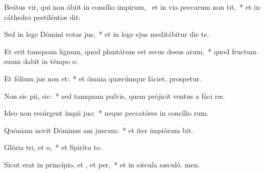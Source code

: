 \item Beátus vir, qui non ábiit in consílio impirum,~\pscross{} et in via peccarum non tit,~* et in cáthedra pestiléntiæ  dit:
\item Sed in lege Dómini votas jus,~* et in lege ejus meditábitur die  te.
\item Et erit tamquam lignum, quod plantátum est secus desus arum,~* quod fructum suum dabit in témpo o:
\item Et fólium jus non et:~* et ómnia quæcúmque fáciet, prospetur.
\item Non sic pii,  sic:~* sed tamquam pulvis, quem prójicit ventus a fáci ræ.
\item Ideo non resúrgent ímpii  juo:~* neque peccatóres in concílio rum.
\item Quóniam novit Dóminus am jusrum:~* et iter impiórum bit.
\item Glória tri, et o,~* et Spirítu to.
\item Sicut erat in princípio, et , et per,~* et in sǽcula sæculó. men.
